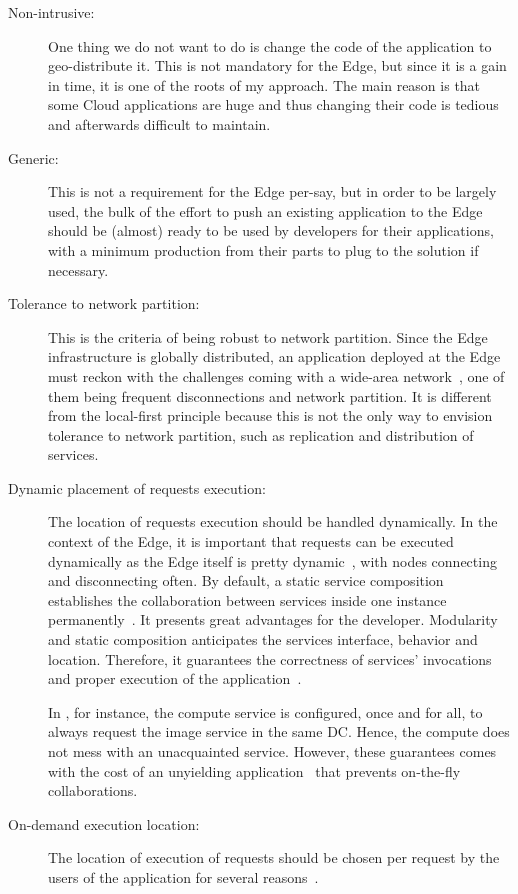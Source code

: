 \begin{description}
\item [Non-intrusive:] One thing we do not want to do is change the
code of the application to geo-distribute it.
%
This is not mandatory for the Edge, but since it is a gain in time, it
is one of the roots of my approach.
%
The main reason is that some Cloud applications are huge and thus
changing their code is tedious and afterwards difficult to maintain.
\item [Generic:] This is not a requirement for the Edge per-say, but
  in order to be largely used, the bulk of the effort to push an
  existing application to the Edge should be (almost) ready to be used
  by developers for their applications, with a minimum production from
  their parts to plug to the solution if necessary.
\item [Tolerance to network partition:] This is the criteria of being
robust to network partition.
%
Since the Edge infrastructure is globally distributed, an application
deployed at the Edge must reckon with the challenges coming with a
wide-area network~\cite{LCR17}, one of them being frequent
disconnections and network partition.
%
It is different from the local-first principle because this is not the
only way to envision tolerance to network partition, such as
replication and distribution of services.
\item [Dynamic placement of requests execution:] The location of
requests execution should be handled dynamically.
%
In the context of the Edge, it is important that requests can be
executed dynamically as the Edge itself is pretty
dynamic~\cite{FYWCS22}, with nodes connecting and disconnecting often.
%
By default, a static service composition establishes the collaboration
between services inside one instance permanently~\cite{DS05}.
%
It presents great advantages for the developer.
%
Modularity and static composition anticipates the services interface,
behavior and location.
%
Therefore, it guarantees the correctness of services’ invocations and
proper execution of the application~\cite{CJ01}.
%

In \os, for instance, the compute service is configured, once and for
all, to always request the image service in the same DC.
%
Hence, the compute does not mess with an unacquainted service.
%
However, these guarantees comes with the cost of an unyielding
application~\cite{DS05,FS04} that prevents on-the-fly collaborations.
\item [On-demand execution location:] The
location of execution of requests should be chosen per request by the
users of the application for several reasons~\cite{TPTE21}.
%


\end{description}
